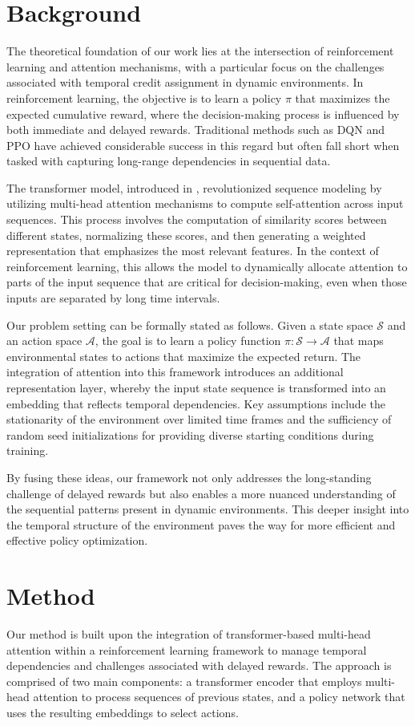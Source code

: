 \documentclass{article}
\begin{document}
\section{Background}
The theoretical foundation of our work lies at the intersection of reinforcement learning and attention mechanisms, with a particular focus on the challenges associated with temporal credit assignment in dynamic environments. In reinforcement learning, the objective is to learn a policy $\pi$ that maximizes the expected cumulative reward, where the decision-making process is influenced by both immediate and delayed rewards. Traditional methods such as DQN  and PPO  have achieved considerable success in this regard but often fall short when tasked with capturing long-range dependencies in sequential data.

The transformer model, introduced in \cite{ashish_2017_attention}, revolutionized sequence modeling by utilizing multi-head attention mechanisms to compute self-attention across input sequences. This process involves the computation of similarity scores between different states, normalizing these scores, and then generating a weighted representation that emphasizes the most relevant features. In the context of reinforcement learning, this allows the model to dynamically allocate attention to parts of the input sequence that are critical for decision-making, even when those inputs are separated by long time intervals.

Our problem setting can be formally stated as follows. Given a state space $\mathcal{S}$ and an action space $\mathcal{A}$, the goal is to learn a policy function $\pi: \mathcal{S} \to \mathcal{A}$ that maps environmental states to actions that maximize the expected return. The integration of attention into this framework introduces an additional representation layer, whereby the input state sequence is transformed into an embedding that reflects temporal dependencies. Key assumptions include the stationarity of the environment over limited time frames and the sufficiency of random seed initializations for providing diverse starting conditions during training.

By fusing these ideas, our framework not only addresses the long-standing challenge of delayed rewards but also enables a more nuanced understanding of the sequential patterns present in dynamic environments. This deeper insight into the temporal structure of the environment paves the way for more efficient and effective policy optimization.

\section{Method}
Our method is built upon the integration of transformer-based multi-head attention within a reinforcement learning framework to manage temporal dependencies and challenges associated with delayed rewards. The approach is comprised of two main components: a transformer encoder that employs multi-head attention to process sequences of previous states, and a policy network that uses the resulting embeddings to select actions.
\end{document}
